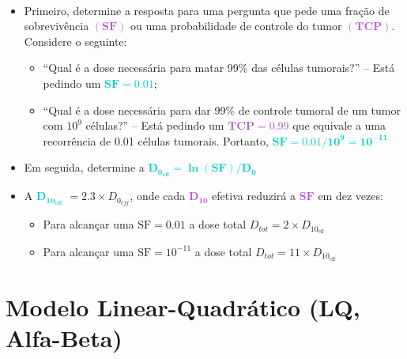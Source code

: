 \documentclass[11pt,a4paper]{article}
\begin{document}
	\

	\begin{tcolorbox}[width=\textwidth, colback={white}, colbacktitle={DarkTurquoise!50!white}, title={$\bigstar$ \LobsterTwo{Para entender Melhor: Curva de Sobrevivência E Fracionamento} $\bigstar $}, coltitle={CarnationPink}, colframe={DarkTurquoise}, fonttitle=\rmfamily\bfseries\Large]
		
		\begin{itemize}
			\item Primeiro, determine a resposta para uma pergunta que pede uma fração de sobrevivência \textcolor{MediumOrchid}{$\mathbf{(SF)}$}  ou uma probabilidade de controle do tumor \textcolor{MediumOrchid}{$\mathbf{(TCP)}$}. Considere o seguinte:
			\begin{itemize}[label=\textcolor{CarnationPink}{$\star$}]
				\item ``Qual é a dose necessária para matar 99\% das células tumorais?'' -- Está pedindo um \textcolor{DarkTurquoise}{$\mathbf{SF = 0.01}$};
				\item ``Qual é a dose necessária para dar 99\% de controle tumoral de um tumor com $\mathrm{10^9}$ células?'' -- Está pedindo um \textcolor{MediumOrchid}{$\mathbf{TCP = 0.99}$} que equivale a uma recorrência de 0.01 células tumorais. Portanto, \textcolor{DarkTurquoise}{$\mathbf{SF = 0.01/10^9 = 10^{-11}}$}
			\end{itemize}
			\item Em seguida, determine a \textcolor{DarkTurquoise}{$\mathbf{D_{0_{\text{eff}}} = \ln (\text{SF})/D_0}$}
			\item A \textcolor{DarkTurquoise}{$\mathbf{D_{10_{eff}}}$} $= 2.3 \times D_{0_{eff}}$, onde cada \textcolor{MediumOrchid}{$\mathbf{D_{10}}$} efetiva reduzirá a \textcolor{MediumOrchid}{$\mathbf{SF}$} em dez vezes:
			\begin{itemize}[label=\textcolor{CarnationPink}{$\star$}]
				\item Para alcançar uma $\text{SF} = 0.01$ a dose total $D_{tot} = 2 \times D_{10_{\text{eff}}}$
				\item Para alcançar uma $\text{SF} = 10^{-11}$ a dose total $D_{tot} = 11 \times D_{10_{\text{eff}}}$
			\end{itemize}
		\end{itemize}

	\end{tcolorbox}
	
\section{Modelo Linear-Quadrático (LQ, Alfa-Beta)}
\end{document}

